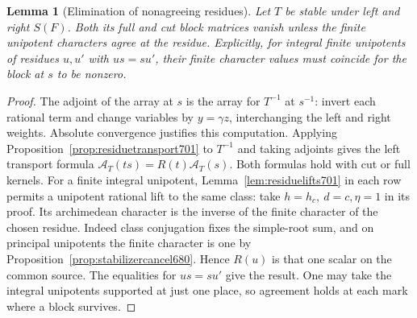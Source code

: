 \documentclass[a4paper,11pt]{article}
\newtheorem{lemma}[proposition]{Lemma}
\theoremstyle{definition}
\theoremstyle{remark}
\numberwithin{equation}{section}
\begin{document}
\begin{lemma}[Elimination of nonagreeing residues]\leavevmode
\label{lem:finiteagreement702}
Let \(T\) be stable under left and right \(S(F)\). Both its full
and cut block matrices vanish unless the finite unipotent
characters agree at the residue. Explicitly, for integral
finite unipotents of residues \(u,u'\) with \(us=su'\), their
finite character values must coincide for the block at \(s\)
to be nonzero.
\end{lemma}
\begin{proof}
The adjoint of the array at \(s\) is the array for \(T^{-1}\)
at \(s^{-1}\): invert each rational term and change variables
by \(y=\gamma z\), interchanging the left and right weights.
Absolute convergence justifies this computation. Applying
Proposition~\ref{prop:residuetransport701} to \(T^{-1}\) and
taking adjoints gives the left transport formula
\(\mathcal A_T(ts)=R(t)\mathcal A_T(s)\). Both formulas hold
with cut or full kernels. For a finite integral unipotent,
Lemma~\ref{lem:residuelifts701} in each row permits a unipotent
rational lift to the same class: take \(h=h_c,\ d=c,\eta=1\)
in its proof. Its archimedean character is the inverse of
the finite character of the chosen residue. Indeed class
conjugation fixes the simple-root sum, and on principal
unipotents the finite character is one by
Proposition~\ref{prop:stabilizercancel680}. Hence \(R(u)\)
is that one scalar on the common source. The equalities for
\(us=su'\) give the result. One may take the integral
unipotents supported at just one place, so agreement holds
at each mark where a block survives.
\end{proof}
\end{document}
